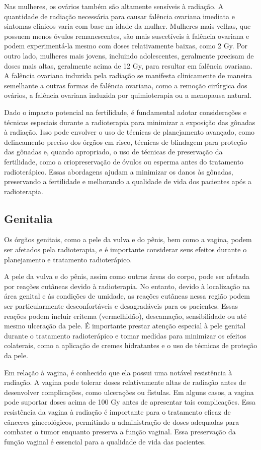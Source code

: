 \documentclass[11pt,a4paper]{article}
\begin{document}
	Nas mulheres, os ovários também são altamente sensíveis à radiação. A quantidade de radiação necessária para causar falência ovariana imediata e sintomas clínicos varia com base na idade da mulher. Mulheres mais velhas, que possuem menos óvulos remanescentes, são mais suscetíveis à falência ovariana e podem experimentá-la mesmo com doses relativamente baixas, como 2 Gy. Por outro lado, mulheres mais jovens, incluindo adolescentes, geralmente precisam de doses mais altas, geralmente acima de 12 Gy, para resultar em falência ovariana. A falência ovariana induzida pela radiação se manifesta clinicamente de maneira semelhante a outras formas de falência ovariana, como a remoção cirúrgica dos ovários, a falência ovariana induzida por quimioterapia ou a menopausa natural.

	Dado o impacto potencial na fertilidade, é fundamental adotar considerações e técnicas especiais durante a radioterapia para minimizar a exposição das gônadas à radiação. Isso pode envolver o uso de técnicas de planejamento avançado, como delineamento preciso dos órgãos em risco, técnicas de blindagem para proteção das gônadas e, quando apropriado, o uso de técnicas de preservação da fertilidade, como a criopreservação de óvulos ou esperma antes do tratamento radioterápico. Essas abordagens ajudam a minimizar os danos às gônadas, preservando a fertilidade e melhorando a qualidade de vida dos pacientes após a radioterapia.

\subsection*{Genitalia}

	Os órgãos genitais, como a pele da vulva e do pênis, bem como a vagina, podem ser afetados pela radioterapia, e é importante considerar seus efeitos durante o planejamento e tratamento radioterápico.

	A pele da vulva e do pênis, assim como outras áreas do corpo, pode ser afetada por reações cutâneas devido à radioterapia. No entanto, devido à localização na área genital e às condições de umidade, as reações cutâneas nessa região podem ser particularmente desconfortáveis e desagradáveis para os pacientes. Essas reações podem incluir eritema (vermelhidão), descamação, sensibilidade ou até mesmo ulceração da pele. É importante prestar atenção especial à pele genital durante o tratamento radioterápico e tomar medidas para minimizar os efeitos colaterais, como a aplicação de cremes hidratantes e o uso de técnicas de proteção da pele.

	Em relação à vagina, é conhecido que ela possui uma notável resistência à radiação. A vagina pode tolerar doses relativamente altas de radiação antes de desenvolver complicações, como ulcerações ou fístulas. Em alguns casos, a vagina pode suportar doses acima de 100 Gy antes de apresentar tais complicações. Essa resistência da vagina à radiação é importante para o tratamento eficaz de cânceres ginecológicos, permitindo a administração de doses adequadas para combater o tumor enquanto preserva a função vaginal. Essa preservação da função vaginal é essencial para a qualidade de vida das pacientes.
\end{document}
